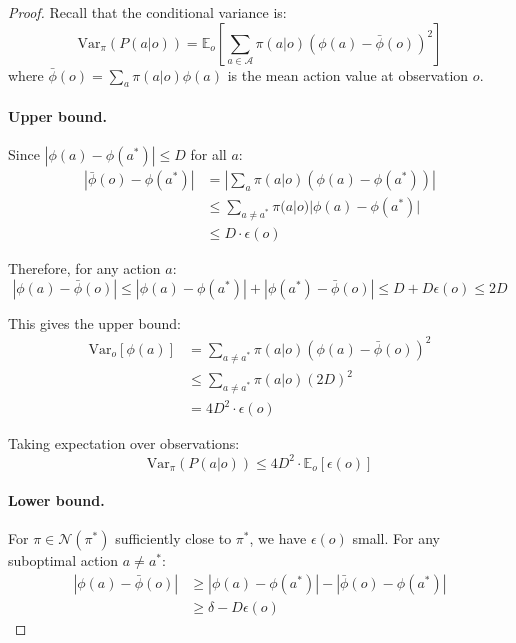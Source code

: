 \begin{proof}
Recall that the conditional variance is:
\begin{equation}
    \text{Var}_{\pi}(P(a|o)) = \mathbb{E}_o\left[\sum_{a \in \mathcal{A}} \pi(a|o) (\phi(a) - \bar{\phi}(o))^2\right]
\end{equation}
where $\bar{\phi}(o) = \sum_a \pi(a|o) \phi(a)$ is the mean action value at observation $o$.

\paragraph{Upper bound.} Since $|\phi(a) - \phi(a^*)| \le D$ for all $a$:
\begin{align}
    |\bar{\phi}(o) - \phi(a^*)| &= \left|\sum_a \pi(a|o) (\phi(a) - \phi(a^*))\right| \\
    &\le \sum_{a \neq a^*} \pi(a|o) |\phi(a) - \phi(a^*)| \\
    &\le D \cdot \epsilon(o)
\end{align}

Therefore, for any action $a$:
\begin{equation}
    |\phi(a) - \bar{\phi}(o)| \le |\phi(a) - \phi(a^*)| + |\phi(a^*) - \bar{\phi}(o)| \le D + D\epsilon(o) \le 2D
\end{equation}

This gives the upper bound:
\begin{align}
    \text{Var}_o[\phi(a)] &= \sum_{a \neq a^*} \pi(a|o) (\phi(a) - \bar{\phi}(o))^2 \\
    &\le \sum_{a \neq a^*} \pi(a|o) (2D)^2 \\
    &= 4D^2 \cdot \epsilon(o)
\end{align}

Taking expectation over observations:
\begin{equation}
    \text{Var}_{\pi}(P(a|o)) \le 4D^2 \cdot \mathbb{E}_o[\epsilon(o)]
\end{equation}

\paragraph{Lower bound.} For $\pi \in \mathcal{N}(\pi^*)$ sufficiently close to $\pi^*$, we have $\epsilon(o)$ small. For any suboptimal action $a \neq a^*$:
\begin{align}
    |\phi(a) - \bar{\phi}(o)| &\ge |\phi(a) - \phi(a^*)| - |\bar{\phi}(o) - \phi(a^*)| \\
    &\ge \delta - D\epsilon(o)
\end{align}


\end{proof}
